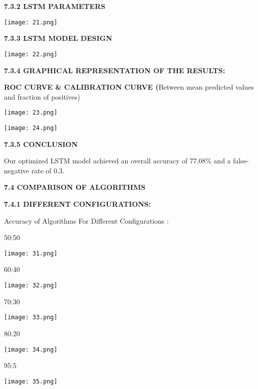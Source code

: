 \documentclass[a4paper,12pt]{article}
\begin{document}
\textbf{7.3.2 LSTM PARAMETERS}

\texttt{[image: 21.png]}

\textbf{7.3.3 LSTM MODEL DESIGN}

\texttt{[image: 22.png]}

\textbf{7.3.4 GRAPHICAL REPRESENTATION OF THE RESULTS:}

\textbf{ROC CURVE \& CALIBRATION CURVE (}Between mean predicted values
and fraction of positives)

\texttt{[image: 23.png]}

\texttt{[image: 24.png]}

\textbf{7.3.5 CONCLUSION}

Our optimized LSTM model achieved an overall accuracy of 77.08\% and a
false-negative rate of 0.3.

\textbf{7.4 COMPARISON OF ALGORITHMS}

\textbf{7.4.1 DIFFERENT CONFIGURATIONS:}


Accuracy of  Algorithms For Different Configurations :



50:50


\texttt{[image: 31.png]}







60:40


\texttt{[image: 32.png]}









70:30


\texttt{[image: 33.png]}









80:20


\texttt{[image: 34.png]}









95:5


\texttt{[image: 35.png]}
\end{document}
